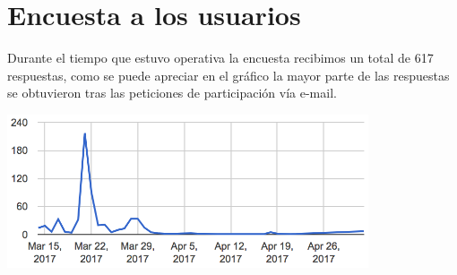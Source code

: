 \section{Encuesta a los usuarios}

Durante el tiempo que estuvo operativa la encuesta recibimos un total de 617 respuestas, como se puede apreciar en el gráfico la mayor parte de las respuestas se obtuvieron tras las peticiones de participación vía e-mail.

    \includegraphics[width=0.8\textwidth]{../charts/00_fecha}


